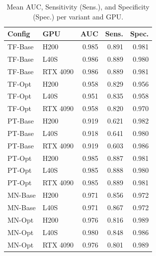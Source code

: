 \begin{table}[h]
  \centering
  \caption{Mean AUC, Sensitivity (Sens.), and Specificity (Spec.) per variant and GPU.}
  \label{tab:quality_summary}
  \begin{tabular}{llrrr}
    \hline
    \textbf{Config} & \textbf{GPU} & \textbf{AUC} & \textbf{Sens.} & \textbf{Spec.} \\
    \hline
    TF-Base  & H200     & 0.985 & 0.891 & 0.981 \\
    TF-Base  & L40S     & 0.986 & 0.889 & 0.980 \\
    TF-Base  & RTX 4090 & 0.986 & 0.889 & 0.981 \\
    \hline
    TF-Opt   & H200     & 0.958 & 0.829 & 0.956 \\
    TF-Opt   & L40S     & 0.951 & 0.835 & 0.958 \\
    TF-Opt   & RTX 4090 & 0.958 & 0.820 & 0.970 \\
    \hline
    PT-Base  & H200     & 0.919 & 0.621 & 0.982 \\
    PT-Base  & L40S     & 0.918 & 0.641 & 0.980 \\
    PT-Base  & RTX 4090 & 0.919 & 0.603 & 0.986 \\
    \hline
    PT-Opt   & H200     & 0.985 & 0.887 & 0.981 \\
    PT-Opt   & L40S     & 0.985 & 0.888 & 0.980 \\
    PT-Opt   & RTX 4090 & 0.985 & 0.889 & 0.981 \\
    \hline
    MN-Base  & H200     & 0.971 & 0.856 & 0.972 \\
    MN-Base  & L40S     & 0.971 & 0.867 & 0.972 \\
    \hline
    MN-Opt   & H200     & 0.976 & 0.816 & 0.989 \\
    MN-Opt   & L40S     & 0.980 & 0.848 & 0.986 \\
    MN-Opt   & RTX 4090 & 0.976 & 0.801 & 0.989 \\
    \hline
  \end{tabular}
\end{table}

